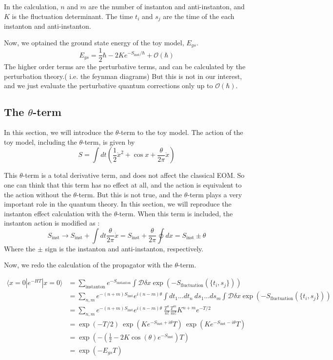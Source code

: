 \documentclass{article}
\begin{document}
In the calculation, $n$ and $m$ are the number of instanton and anti-instanton, and $K$ is the fluctuation determinant.
The time $t_i$ and $s_j$ are the time of the each instanton and anti-instanton.

Now, we optained the ground state energy of the toy model, $E_{gs}$.
\[
    E_{gs} = \frac{1}{2}\hbar-2K e^{-S_{\text{inst}}/\hbar}+ \mathcal{O}(\hbar)
\]
The higher order terms are the perturbative terms, and can be calculated by the perturbation theory.( i.e. the feynman diagrams)
But this is not in our interest, and we just evaluate the perturbative quantum corrections only up to $\mathcal{O}(\hbar)$.

\subsection{The $\theta$-term}
In this section, we will introduce the $\theta$-term to the toy model.
The action of the toy model, including the $\theta$-term, is given by
\[
    S = \int dt \left( \frac{1}{2} \dot{x}^2 + \cos x + \frac{\theta}{2\pi} \dot{x} \right)
\]

This $\theta$-term is a total derivative term, and does not affect the classical EOM.
So one can think that this term has no effect at all, and the action is equivalent to the action without the $\theta$-term.
But this is not true, and the $\theta$-term plays a very important role in the quantum theory.
In this section, we will reproduce the instanton effect calculation with the $\theta$-term.
When this term is included, the instanton action is modified as :
\[
    S_{\text{inst}} \rightarrow S_{\text{inst}} + \int dt \frac{\theta}{2\pi} \dot{x} = S_{\text{inst}} + \frac{\theta}{2\pi} \oint dx = S_{\text{inst}} \pm \theta
\]
Where the $\pm$ sign is the instanton and anti-instanton, respectively.

Now, we redo the calculation of the propagator with the $\theta$-term.

\begin{align*}
    \langle x=0 | e^{-HT} | x=0 \rangle &= \sum_{\text{instanton}} e^{-S_{\text{instanton}}} \int \mathcal{D}\delta x \exp(-S_{\text{fluctuation}}(\{t_i,s_j\})) \\
    &= \sum_{n,m} e^{-(n+m)S_{\text{inst}}}  e^{i(n-m)\theta}  \int dt_1 ... dt_n \ ds_1 ... ds_m \int \mathcal{D}\delta x \exp(-S_{\text{fluctuation}}(\{t_i,s_j\})) \\
    &= \sum_{n,m} e^{-(n+m)S_{\text{inst}}} e^{i(n-m)\theta} \ \frac{T^n}{n!} \frac{T^m}{m!} K^{n+m} e^{-T/2} \\
    &= \exp(-T/2) \ \exp(K e^{-S_{\text{inst}}+i\theta} T) \ \exp(K e^{-S_{\text{inst}}-i\theta} T) \\
    &= \exp(-(\frac{1}{2}-2K \cos (\theta )e^{-S_{\text{inst}}})T) \\
    &= \exp(-E_{gs}T)
\end{align*}
\end{document}
